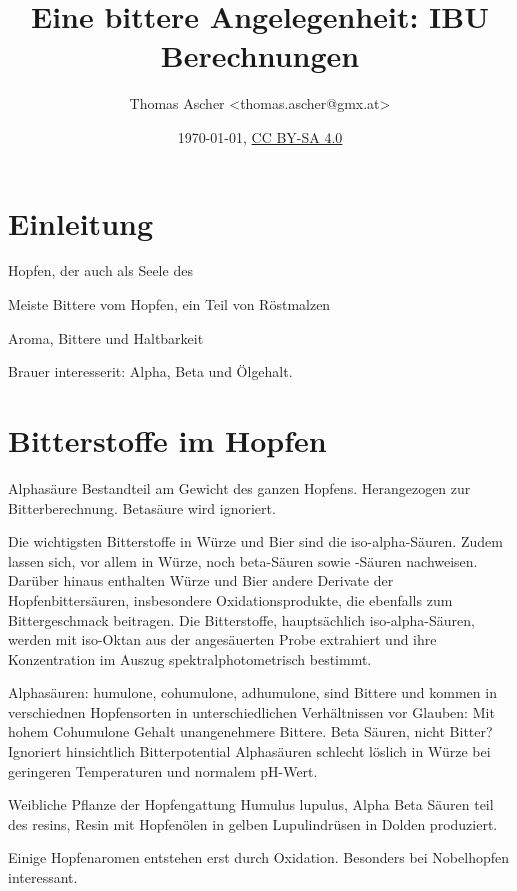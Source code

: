 \documentclass[a4paper,parskip=half]{scrartcl}
\title{Eine bittere Angelegenheit: IBU Berechnungen}
\author{Thomas Ascher <thomas.ascher@gmx.at>}
\date{\today, \href{http://creativecommons.org/licenses/by-sa/4.0/}{CC BY-SA 4.0}}
\begin{document}
\maketitle

\section*{Einleitung}

Hopfen, der auch als Seele des 

\parencite{Bastgen2020}

Meiste Bittere vom Hopfen, ein Teil von Röstmalzen \parencite[11]{Garetz1994}

\parencite[10]{Garetz1994}
Aroma, Bittere und Haltbarkeit

\parencite[103]{Garetz1994}
Brauer interesserit: Alpha, Beta und Ölgehalt.


\section*{Bitterstoffe im Hopfen}


\parencite[34]{Garetz1994}
Alphasäure Bestandteil am Gewicht des ganzen Hopfens. Herangezogen
zur Bitterberechnung. Betasäure wird ignoriert.


\parencite{MEBAK2020}
Die wichtigsten Bitterstoffe in Würze und Bier sind die iso-alpha-Säuren. Zudem lassen sich, vor allem in Würze, noch beta-Säuren sowie -Säuren nachweisen. Darüber hinaus enthalten Würze und Bier andere Derivate der Hopfenbittersäuren, insbesondere Oxidationsprodukte, die ebenfalls zum Bittergeschmack beitragen.
Die Bitterstoffe, hauptsächlich iso-alpha-Säuren, werden mit iso-Oktan aus der
angesäuerten Probe extrahiert und ihre Konzentration im Auszug spektralphotometrisch bestimmt.


\parencite[11]{Garetz1994}
Alphasäuren: humulone, cohumulone, adhumulone, sind Bittere und kommen in
verschiednen Hopfensorten in unterschiedlichen Verhältnissen vor
Glauben: Mit hohem Cohumulone Gehalt unangenehmere Bittere.
Beta Säuren, nicht Bitter? Ignoriert hinsichtlich Bitterpotential
Alphasäuren schlecht löslich in Würze bei geringeren Temperaturen
und normalem pH-Wert.

\parencite[20]{Garetz1994}
Weibliche Pflanze der Hopfengattung Humulus lupulus, Alpha Beta
Säuren teil des resins, Resin mit Hopfenölen in gelben
Lupulindrüsen in Dolden produziert.

\parencite[100]{Garetz1994} Einige Hopfenaromen entstehen erst
durch Oxidation. Besonders bei Nobelhopfen interessant.
\end{document}
